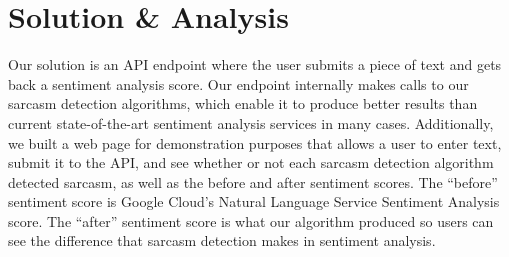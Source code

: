 \documentclass[conference]{IEEEtran}
\begin{document}
\section{Solution \& Analysis}
Our solution is an API endpoint where the user submits a piece of text and gets back a sentiment analysis score. Our endpoint internally makes calls to our sarcasm detection algorithms, which enable it to produce better results than current state-of-the-art sentiment analysis services in many cases. Additionally, we built a web page for demonstration purposes that allows a user to enter text, submit it to the API, and see whether or not each sarcasm detection algorithm detected sarcasm, as well as the before and after sentiment scores. The “before” sentiment score is Google Cloud’s Natural Language Service Sentiment Analysis score. The “after” sentiment score is what our algorithm produced so users can see the difference that sarcasm detection makes in sentiment analysis.\\
\end{document}

